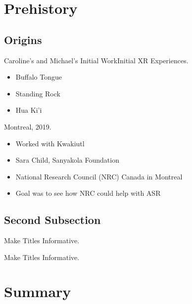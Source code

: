 \documentclass{beamer}
\begin{document}
\section{Prehistory}

\subsection[Origins]{Origins}

\begin{frame}{Caroline's and Michael's Initial Work}{Initial XR Experiences.}

  \begin{itemize}
  \item
    Buffalo Tongue
  \item
    Standing Rock
  \item
    Hua Ki'i
  \end{itemize}
\end{frame}

\begin{frame}{Montreal, 2019.}
  \begin{itemize}
  \item
    Worked with Kwakiutl
  \item
    Sara Child, Sanyakola Foundation
  \item    
    National Research Council (NRC) Canada in Montreal
  \item
    Goal was to see how NRC could help with ASR
  \end{itemize}
\end{frame}

\subsection{Second Subsection}

\begin{frame}{Make Titles Informative.}
\end{frame}

\begin{frame}{Make Titles Informative.}
\end{frame}



\section*{Summary}
\end{document}
